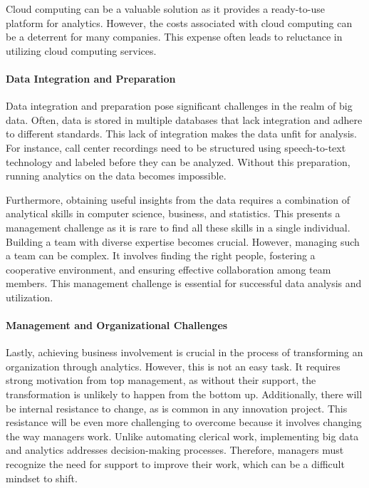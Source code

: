 Cloud computing can be a valuable solution as it provides a ready-to-use
platform for analytics. However, the costs associated with cloud
computing can be a deterrent for many companies. This expense often
leads to reluctance in utilizing cloud computing services.

\paragraph{Data Integration and Preparation}

Data integration and preparation pose significant challenges in the
realm of big data. Often, data is stored in multiple databases that lack
integration and adhere to different standards. This lack of integration
makes the data unfit for analysis. For instance, call center recordings
need to be structured using speech-to-text technology and labeled before
they can be analyzed. Without this preparation, running analytics on the
data becomes impossible.

Furthermore, obtaining useful insights from the data requires a
combination of analytical skills in computer science, business, and
statistics. This presents a management challenge as it is rare to find
all these skills in a single individual. Building a team with diverse
expertise becomes crucial. However, managing such a team can be complex.
It involves finding the right people, fostering a cooperative
environment, and ensuring effective collaboration among team members.
This management challenge is essential for successful data analysis and
utilization.

\paragraph{Management and Organizational Challenges}

Lastly, achieving business involvement is crucial in the process of
transforming an organization through analytics. However, this is not an
easy task. It requires strong motivation from top management, as without
their support, the transformation is unlikely to happen from the bottom
up. Additionally, there will be internal resistance to change, as is
common in any innovation project. This resistance will be even more
challenging to overcome because it involves changing the way managers
work. Unlike automating clerical work, implementing big data and
analytics addresses decision-making processes. Therefore, managers must
recognize the need for support to improve their work, which can be a
difficult mindset to shift.

